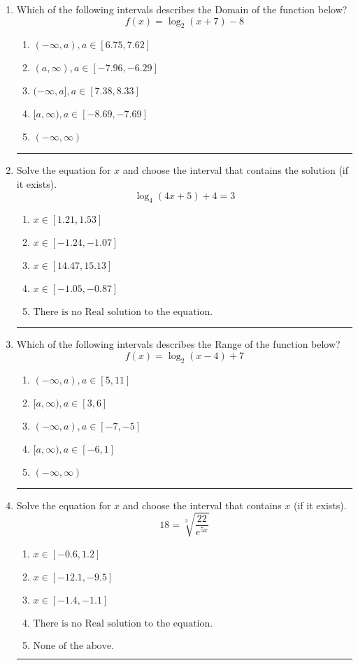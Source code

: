 \documentclass[14pt]{extbook}
\newcommand{\litem}[1]{\item#1\hspace*{-1cm}\rule{\textwidth}{0.4pt}}
\begin{document}
\begin{enumerate}
\litem{
Which of the following intervals describes the Domain of the function below?\[ f(x) = \log_2{(x+7)}-8 \]\begin{enumerate}[label=\Alph*.]
\item \( (-\infty, a), a \in [6.75, 7.62] \)
\item \( (a, \infty), a \in [-7.96, -6.29] \)
\item \( (-\infty, a], a \in [7.38, 8.33] \)
\item \( [a, \infty), a \in [-8.69, -7.69] \)
\item \( (-\infty, \infty) \)

\end{enumerate} }
\litem{
Solve the equation for $x$ and choose the interval that contains the solution (if it exists).\[ \log_{4}{(4x+5)}+4 = 3 \]\begin{enumerate}[label=\Alph*.]
\item \( x \in [1.21, 1.53] \)
\item \( x \in [-1.24, -1.07] \)
\item \( x \in [14.47, 15.13] \)
\item \( x \in [-1.05, -0.87] \)
\item \( \text{There is no Real solution to the equation.} \)

\end{enumerate} }
\litem{
Which of the following intervals describes the Range of the function below?\[ f(x) = \log_2{(x-4)}+7 \]\begin{enumerate}[label=\Alph*.]
\item \( (-\infty, a), a \in [5, 11] \)
\item \( [a, \infty), a \in [3, 6] \)
\item \( (-\infty, a), a \in [-7, -5] \)
\item \( [a, \infty), a \in [-6, 1] \)
\item \( (-\infty, \infty) \)

\end{enumerate} }
\litem{
 Solve the equation for $x$ and choose the interval that contains $x$ (if it exists).\[  18 = \sqrt[3]{\frac{22}{e^{5x}}} \]\begin{enumerate}[label=\Alph*.]
\item \( x \in [-0.6, 1.2] \)
\item \( x \in [-12.1, -9.5] \)
\item \( x \in [-1.4, -1.1] \)
\item \( \text{There is no Real solution to the equation.} \)
\item \( \text{None of the above.} \)


\end{enumerate}}
\end{enumerate}
\end{document}
